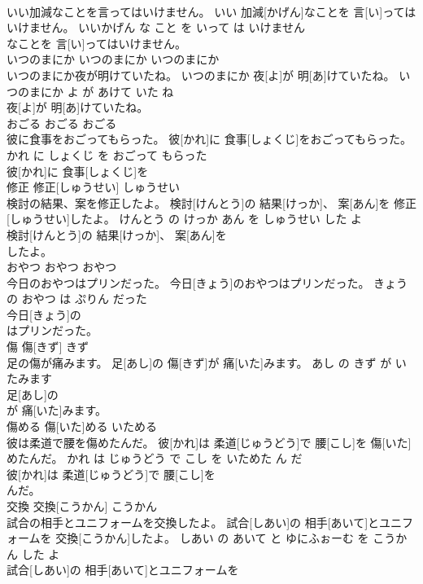 \documentclass[8pt]{extreport}
\begin{document}
\begin{CJK}{UTF8}{min}
\\	いい加減なことを言ってはいけません。	いい 加減[かげん]なことを 言[い]ってはいけません。	いいかげん な こと を いって は いけません	
\\	なことを 言[い]ってはいけません。			
\\	いつのまにか	いつのまにか	いつのまにか	
\\	いつのまにか夜が明けていたね。	いつのまにか 夜[よ]が 明[あ]けていたね。	いつのまにか よ が あけて いた ね	
\\	夜[よ]が 明[あ]けていたね。			
\\	おごる	おごる	おごる	
\\	彼に食事をおごってもらった。	彼[かれ]に 食事[しょくじ]をおごってもらった。	かれ に しょくじ を おごって もらった	
\\	彼[かれ]に 食事[しょくじ]を
\\	修正	修正[しゅうせい]	しゅうせい	
\\	検討の結果、案を修正したよ。	検討[けんとう]の 結果[けっか]、 案[あん]を 修正[しゅうせい]したよ。	けんとう の けっか あん を しゅうせい した よ	
\\	検討[けんとう]の 結果[けっか]、 案[あん]を
\\	したよ。			
\\	おやつ	おやつ	おやつ	
\\	今日のおやつはプリンだった。	今日[きょう]のおやつはプリンだった。	きょう の おやつ は ぷりん だった	
\\	今日[きょう]の
\\	はプリンだった。			
\\	傷	傷[きず]	きず	
\\	足の傷が痛みます。	足[あし]の 傷[きず]が 痛[いた]みます。	あし の きず が いたみます	
\\	足[あし]の
\\	が 痛[いた]みます。			
\\	傷める	傷[いた]める	いためる	
\\	彼は柔道で腰を傷めたんだ。	彼[かれ]は 柔道[じゅうどう]で 腰[こし]を 傷[いた]めたんだ。	かれ は じゅうどう で こし を いためた ん だ	
\\	彼[かれ]は 柔道[じゅうどう]で 腰[こし]を
\\	んだ。			
\\	交換	交換[こうかん]	こうかん	
\\	試合の相手とユニフォームを交換したよ。	試合[しあい]の 相手[あいて]とユニフォームを 交換[こうかん]したよ。	しあい の あいて と ゆにふぉーむ を こうかん した よ	
\\	試合[しあい]の 相手[あいて]とユニフォームを

\end{CJK}
\end{document}
